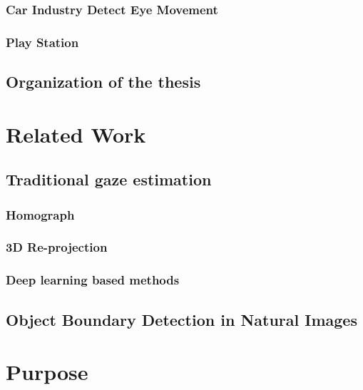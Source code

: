 \documentclass[senior]{IPSstyle}
\begin{document}
\subsection{Car Industry Detect Eye Movement}

\subsection{Play Station}



\section{Organization of the thesis}

\chapter{Related Work} \label{related_work}





\section{Traditional gaze estimation}
\subsection{Homograph}
\subsection{3D Re-projection}
\subsection{Deep learning based methods}

\section{Object Boundary Detection in Natural Images}



\chapter{Purpose} \label{methodology}
\end{document}
